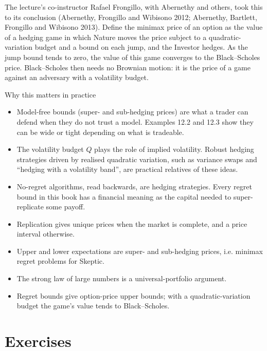 \documentclass[11pt,a4paper,openany]{book}
\begin{document}
The lecture's co-instructor Rafael Frongillo, with Abernethy and others, took this to its conclusion (Abernethy, Frongillo and Wibisono 2012; Abernethy, Bartlett, Frongillo and Wibisono 2013). Define the minimax price of an option as the value of a hedging game in which Nature moves the price subject to a quadratic-variation budget and a bound on each jump, and the Investor hedges. As the jump bound tends to zero, the value of this game converges to the Black–Scholes price. Black–Scholes then needs no Brownian motion: it is the price of a game against an adversary with a volatility budget.

\begin{bfin}{Why this matters in practice}
\begin{itemize}
\item Model-free bounds (super- and sub-hedging prices) are what a trader can defend when they do not trust a model. Examples 12.2 and 12.3 show they can be wide or tight depending on what is tradeable.
\item The volatility budget $Q$ plays the role of implied volatility. Robust hedging strategies driven by realised quadratic variation, such as variance swaps and ``hedging with a volatility band'', are practical relatives of these ideas.
\item No-regret algorithms, read backwards, are hedging strategies. Every regret bound in this book has a financial meaning as the capital needed to super-replicate some payoff.
\end{itemize}
\end{bfin}

\begin{takeaways}
\begin{itemize}
\item Replication gives unique prices when the market is complete, and a price interval otherwise.
\item Upper and lower expectations are super- and sub-hedging prices, i.e. minimax regret problems for Skeptic.
\item The strong law of large numbers is a universal-portfolio argument.
\item Regret bounds give option-price upper bounds; with a quadratic-variation budget the game's value tends to Black–Scholes.
\end{itemize}
\end{takeaways}

\section*{Exercises}\label{ch12-ex}
\end{document}

